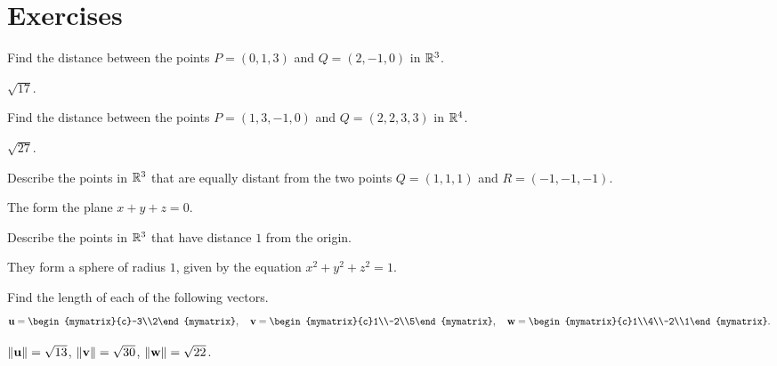 \section*{Exercises}

\begin{ex}
  Find the distance between the points $P=(0,1,3)$ and
  $Q=(2,-1,0)$ in $\mathbb{R}^3$.
  \begin{sol}
    $\sqrt{17}$.
  \end{sol}
\end{ex}

\begin{ex}
  Find the distance between the points $P=(1,3,-1,0)$ and
  $Q=(2,2,3,3)$ in $\mathbb{R}^4$.
  \begin{sol}
    $\sqrt{27}$.
  \end{sol}
\end{ex}

\begin{ex}
  Describe the points in $\mathbb{R}^3$ that are equally distant from the two
  points $Q=(1,1,1) $ and $R=(-1,-1,-1)$.
  \begin{sol}
    The form the plane $x+y+z=0$. 
  \end{sol}
\end{ex}

\begin{ex}
  Describe the points in $\mathbb{R}^3$ that have distance $1$ from the origin.
  \begin{sol}
    They form a sphere of radius $1$, given by the equation
    $x^2+y^2+z^2=1$.
  \end{sol}
\end{ex}

\begin{ex}
  Find the length of each of the following vectors.
  \begin{equation*}
    \vect{u}=\begin{mymatrix}{c}-3\\2\end{mymatrix}, \quad
    \vect{v}=\begin{mymatrix}{c}1\\-2\\5\end{mymatrix}, \quad
    \vect{w}=\begin{mymatrix}{c}1\\4\\-2\\1\end{mymatrix}.
  \end{equation*}
  \begin{sol}
    $\left\|\mbox{\bf u}\right\| = \sqrt{13}$, $\left\|\mbox{\bf v}\right\| = \sqrt{30}$,
    $\left\|\mbox{\bf w}\right\| = \sqrt{22}$.
  \end{sol}
\end{ex}

